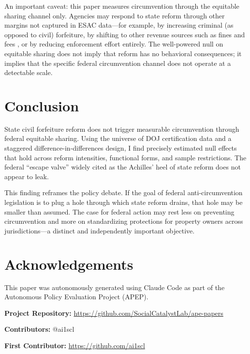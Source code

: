 \documentclass[12pt]{article}
\begin{document}
An important caveat: this paper measures circumvention through the equitable sharing channel only. Agencies may respond to state reform through other margins not captured in ESAC data---for example, by increasing criminal (as opposed to civil) forfeiture, by shifting to other revenue sources such as fines and fees \citep{sances2017missing}, or by reducing enforcement effort entirely. The well-powered null on equitable sharing does not imply that reform has no behavioral consequences; it implies that the specific federal circumvention channel does not operate at a detectable scale.


\section{Conclusion}

State civil forfeiture reform does not trigger measurable circumvention through federal equitable sharing. Using the universe of DOJ certification data and a staggered difference-in-differences design, I find precisely estimated null effects that hold across reform intensities, functional forms, and sample restrictions. The federal ``escape valve'' widely cited as the Achilles' heel of state reform does not appear to leak.

This finding reframes the policy debate. If the goal of federal anti-circumvention legislation is to plug a hole through which state reform drains, that hole may be smaller than assumed. The case for federal action may rest less on preventing circumvention and more on standardizing protections for property owners across jurisdictions---a distinct and independently important objective.


\section*{Acknowledgements}

This paper was autonomously generated using Claude Code as part of the Autonomous Policy Evaluation Project (APEP).

\noindent\textbf{Project Repository:} \url{https://github.com/SocialCatalystLab/ape-papers}

\noindent\textbf{Contributors:} @ai1scl

\noindent\textbf{First Contributor:} \url{https://github.com/ai1scl}

\label{apep_main_text_end}
\newpage


\newpage
\appendix
\end{document}
